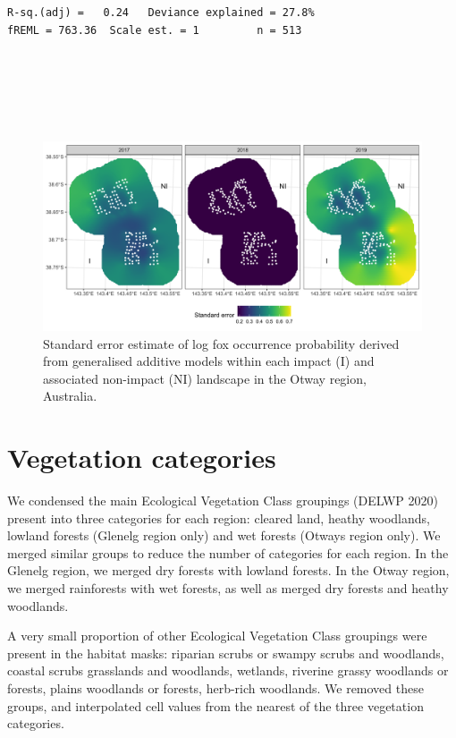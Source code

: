 \documentclass[11pt,a4paper,titlepage,twoside,openright]{style/unimelbthesis}
\begin{document}
\begin{mainmatter}
\begin{verbatim}
R-sq.(adj) =   0.24   Deviance explained = 27.8%
fREML = 763.36  Scale est. = 1         n = 513
\end{verbatim}
\newpage

\(~\)

\(~\)

\(~\)
\begin{figure}

{\centering \includegraphics[width=1\linewidth]{figure/fox_occ_se_otways_600dpi} 

}

\caption{Standard error estimate of log fox occurrence probability derived from generalised additive models within each impact (I) and associated non-impact (NI) landscape in the Otway region, Australia.}\label{fig:density-fox-se-o}
\end{figure}
\newpage

\hypertarget{density-app-veg}{%
\section{Vegetation categories}\label{density-app-veg}}

We condensed the main Ecological Vegetation Class groupings (DELWP 2020) present into three categories for each region: cleared land, heathy woodlands, lowland forests (Glenelg region only) and wet forests (Otways region only). We merged similar groups to reduce the number of categories for each region. In the Glenelg region, we merged dry forests with lowland forests. In the Otway region, we merged rainforests with wet forests, as well as merged dry forests and heathy woodlands.

A very small proportion of other Ecological Vegetation Class groupings were present in the habitat masks: riparian scrubs or swampy scrubs and woodlands, coastal scrubs grasslands and woodlands, wetlands, riverine grassy woodlands or forests, plains woodlands or forests, herb-rich woodlands. We removed these groups, and interpolated cell values from the nearest of the three vegetation categories.


\end{mainmatter}
\end{document}

